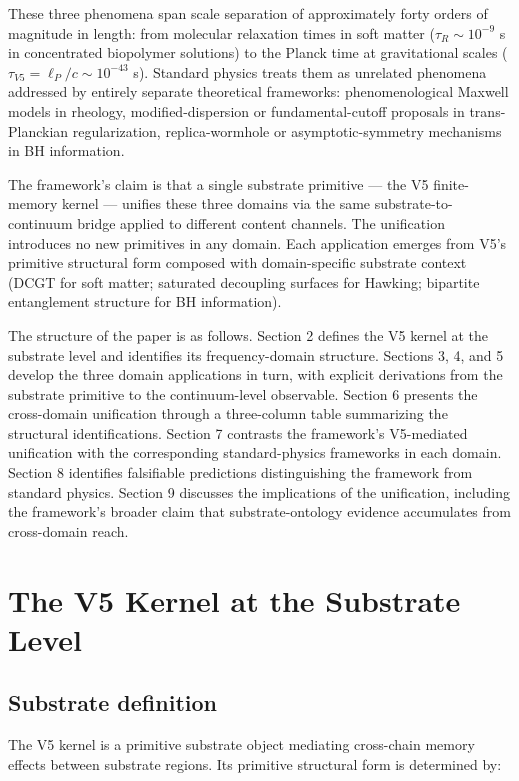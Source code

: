 \documentclass[11pt,a4paper]{article}
\begin{document}
These three phenomena span scale separation of approximately forty orders of magnitude in length: from molecular relaxation times in soft matter ($\tau_R \sim 10^{-9}$ s in concentrated biopolymer solutions) to the Planck time at gravitational scales ($\tau_{V5} = \ell_P/c \sim 10^{-43}$ s). Standard physics treats them as unrelated phenomena addressed by entirely separate theoretical frameworks: phenomenological Maxwell models in rheology, modified-dispersion or fundamental-cutoff proposals in trans-Planckian regularization, replica-wormhole or asymptotic-symmetry mechanisms in BH information.

The framework's claim is that a single substrate primitive --- the V5 finite-memory kernel --- unifies these three domains via the same substrate-to-continuum bridge applied to different content channels. The unification introduces no new primitives in any domain. Each application emerges from V5's primitive structural form composed with domain-specific substrate context (DCGT for soft matter; saturated decoupling surfaces for Hawking; bipartite entanglement structure for BH information).

The structure of the paper is as follows. Section 2 defines the V5 kernel at the substrate level and identifies its frequency-domain structure. Sections 3, 4, and 5 develop the three domain applications in turn, with explicit derivations from the substrate primitive to the continuum-level observable. Section 6 presents the cross-domain unification through a three-column table summarizing the structural identifications. Section 7 contrasts the framework's V5-mediated unification with the corresponding standard-physics frameworks in each domain. Section 8 identifies falsifiable predictions distinguishing the framework from standard physics. Section 9 discusses the implications of the unification, including the framework's broader claim that substrate-ontology evidence accumulates from cross-domain reach.

\section{The V5 Kernel at the Substrate Level}

\subsection{Substrate definition}

The V5 kernel is a primitive substrate object mediating cross-chain memory effects between substrate regions. Its primitive structural form is determined by:
\end{document}
